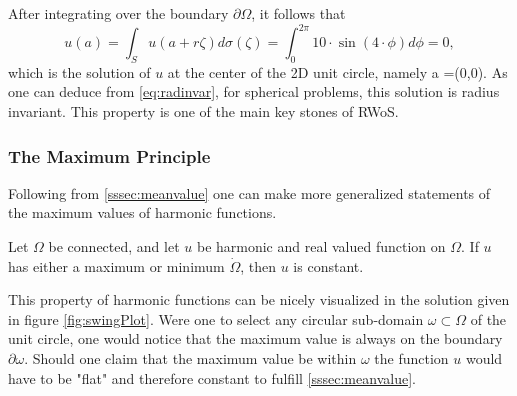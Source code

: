 After integrating over the boundary $\partial \Omega$, it follows that \begin{equation}
u(a) = \int_{S}u(a + r\zeta)d\sigma(\zeta) = \int_{0}^{2\pi} 10\cdot\sin(4\cdot\phi)d\phi = 0,
\label{eq:radinvar}
\end{equation}
which is the solution of $u$ at the center of the 2D unit circle,
namely a =(0,0). As one can deduce from \eqref{eq:radinvar}, for spherical problems, this solution is
radius invariant.  This property is one of the main key stones of \Gls{RWoS}. \label{radiusInvariance}
  \subsubsection{The Maximum Principle}\label{sssec:maximum}
  Following from \ref{sssec:meanvalue} one can make more generalized statements of
  the maximum values of harmonic functions.
  \begin{theorem}
      Let $\Omega$ be connected, and let $u$ be harmonic and real valued function on $\Omega$.
      If $u$ has either a maximum or minimum $\dot{\Omega}$, then $u$ is constant\cite{Sheldon}.
  \end{theorem}

  This property of harmonic functions can be nicely visualized in the solution given
  in figure \ref{fig:swingPlot}. Were one to select any circular
  sub-domain $\omega \subset \Omega$ of the unit circle, one would notice that the maximum value is always
  on the boundary  $\partial \omega$.  Should one claim that the maximum  value be within $\omega$
  the function $u$ would have to be "flat" and therefore constant to fulfill \ref{sssec:meanvalue}.

